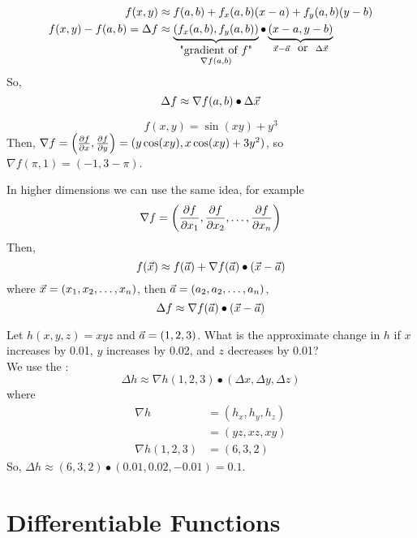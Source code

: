 \documentclass[english, 11pt]{article}
\begin{document}
  \begin{defn}\label{increment form}
    \begin{align*}
      f(x,y) & \approx f(a,b) + f_x(a,b)(x-a) + f_y(a,b)(y-b) \\
      f(x,y)- f(a,b) = {\Delta f}  & \approx \underbrace{(f_x(a,b),f_y(a,b))}_{\substack{\mbox{"gradient of $f$"} \\ \nabla f(a,b)}} \bullet \underbrace{(x-a,y-b)}_{\vec{x} - \vec{a} \mbox{ \ or \ } \Delta \vec{x}}
    \end{align*}
     So,
      \[ \Delta f \approx \nabla f(a,b) \bullet \Delta \vec{x} \]
  \end{defn}

  \begin{exmp}
    \[ f(x,y) = \sin(xy)+y^3 \]
    Then, $\nabla f = \left( \frac{\partial f}{\partial x}, \frac{\partial f}{\partial y} \right) = (y\cos(xy), x\cos(xy) + 3y^2)$, so $\nabla f(\pi,  1) = (-1, 3-\pi)$.
  \end{exmp}

  \begin{rem}
    In higher dimensions we can use the same idea, for example
    \[ \nabla f = \left( \frac{\partial f}{\partial x_1}, \frac{\partial f}{\partial x_2} , \ldots, \frac{\partial f}{\partial x_n} \right) \]
    Then,
    \[ f(\vec{x}) \approx f(\vec{a}) + \nabla f(\vec{a}) \bullet (\vec{x} - \vec{a}) \]
    where $\vec{x} = (x_1, x_2, \ldots, x_n)$, then $\vec{a} = (a_2, a_2, \ldots, a_n)$,
    \[ \Delta f \approx \nabla f(\vec{a}) \bullet (\vec{x} - \vec{a}) \]
  \end{rem}

  \begin{exmp}
    Let $h(x,y,z) = xyz$ and $\vec{a} = (1,2,3)$. What is the approximate change in $h$ if $x$ increases by 0.01, $y$ increases by 0.02, and $z$ decreases by 0.01? \\

    We use the :
    \[ \Delta h \approx \nabla h (1,2,3) \bullet (\Delta x, \Delta y, \Delta z) \]
    where
    \begin{align*}
      \nabla h & = (h_x, h_y, h_z) \\
               & = (yz, xz, xy) \\
      \nabla h(1,2,3) & = (6,3,2)
    \end{align*}
    So, $\Delta h \approx (6,3,2) \bullet (0.01, 0.02, -0.01) = 0.1$.
  \end{exmp}

  \section{Differentiable Functions}
\end{document}
